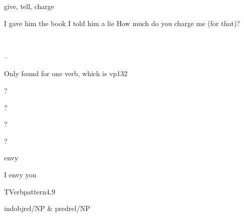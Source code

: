 
\begin{thetadescr}
\evitem give, tell, charge
\esitem
     \begin{examples}
        \example I gave him the book
        \example I told him a lie
        \example How much do you charge me (for that)?
     \end{examples}
\end{thetadescr}


\newpage
{}
\begin{vpattern}
 \norule
\csritem \mbox{}\\
     \begin{csr}
      --
     \end{csr}
\remarksitem Only found for one verb, which is vp132
\end{vpattern}


\begin{thetadescr}
\evitem ?
\esitem
     \begin{examples}
        \example  ?
     \end{examples}
\end{thetadescr}



\begin{thetadescr}
\evitem ?
\esitem
     \begin{examples}
        \example ?
     \end{examples}
\end{thetadescr}


\begin{thetadescr}
\evitem envy
\esitem
     \begin{examples}
        \example I envy you
     \end{examples}
\end{thetadescr}


\newpage
{}
\begin{vpattern}
 TVerbpattern4,9
\csritem \mbox{}\\
     \begin{csr}
      indobjrel/NP & predrel/NP
     \end{csr}
\remarksitem
\end{vpattern}


